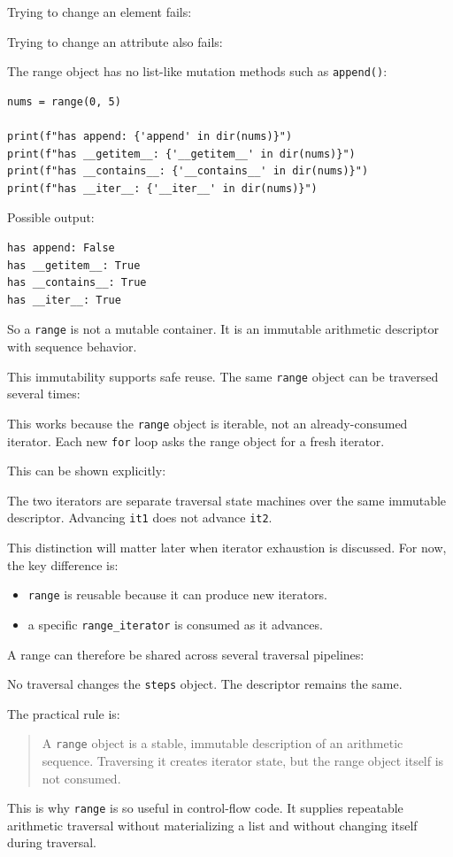 Trying to change an element fails:

Trying to change an attribute also fails:

The range object has no list-like mutation methods such as \texttt{append()}:

\begin{verbatim}
nums = range(0, 5)

print(f"has append: {'append' in dir(nums)}")
print(f"has __getitem__: {'__getitem__' in dir(nums)}")
print(f"has __contains__: {'__contains__' in dir(nums)}")
print(f"has __iter__: {'__iter__' in dir(nums)}")
\end{verbatim}

Possible output:

\begin{verbatim}
has append: False
has __getitem__: True
has __contains__: True
has __iter__: True
\end{verbatim}

So a \texttt{range} is not a mutable container. It is an immutable arithmetic descriptor with sequence behavior.

This immutability supports safe reuse. The same \texttt{range} object can be traversed several times:

This works because the \texttt{range} object is iterable, not an already-consumed iterator. Each new \texttt{for} loop asks the range object for a fresh iterator.

This can be shown explicitly:

The two iterators are separate traversal state machines over the same immutable descriptor. Advancing \texttt{it1} does not advance \texttt{it2}.

This distinction will matter later when iterator exhaustion is discussed. For now, the key difference is:

\begin{itemize}
    \item \texttt{range} is reusable because it can produce new iterators.
    \item a specific \texttt{range\_iterator} is consumed as it advances.
\end{itemize}

A range can therefore be shared across several traversal pipelines:

No traversal changes the \texttt{steps} object. The descriptor remains the same.

The practical rule is:

\begin{quote}
A \texttt{range} object is a stable, immutable description of an arithmetic sequence. Traversing it creates iterator state, but the range object itself is not consumed.
\end{quote}

This is why \texttt{range} is so useful in control-flow code. It supplies repeatable arithmetic traversal without materializing a list and without changing itself during traversal.